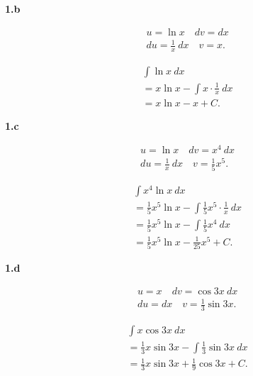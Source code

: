 \documentclass{report}
\begin{document}
    \bigbreak \noindent 
    \textbf{1.b}
    \bigbreak \noindent 
    \begin{minipage}[t]{0.47\textwidth}
        \begin{align*}
            &u = \ln{x} \quad dv = dx \\
            &du = \frac{1}{x}\ dx \quad v = x
        .\end{align*}
    \end{minipage}
    \begin{minipage}[t]{0.47\textwidth}
        \begin{align*}
            &\int \ln{x}\ dx \\
           &=x\ln{x} - \int x \cdot \frac{1}{x}\ dx \\
           &= x\ln{x} - x + C
        .\end{align*}
    \end{minipage}

    \bigbreak \noindent 
    \textbf{1.c}
    \bigbreak \noindent 
    \begin{minipage}[t]{0.47\textwidth}
        \begin{align*}
            &u = \ln{x} \quad dv = x^{4}\ dx \\
            &du = \frac{1}{x}\ dx \quad v = \frac{1}{5}x^{5}
        .\end{align*}
    \end{minipage}
    \begin{minipage}[t]{0.47\textwidth}
        \begin{align*}
           &\int x^{4}\ln{x}\ dx \\ 
           &=\frac{1}{5}x^{5}\ln{x} - \int \frac{1}{5}x^{5} \cdot \frac{1}{x}\ dx \\
           &=\frac{1}{5}x^{5}\ln{x} - \int \frac{1}{5}x^{4}\ dx \\
           &= \frac{1}{5}x^{5}\ln{x} - \frac{1}{25}x^{5} + C
        .\end{align*}
    \end{minipage}

    \pagebreak \bigbreak \noindent 
    \textbf{1.d}
    \bigbreak \noindent 
    \begin{minipage}[t]{0.47\textwidth}
        \begin{align*}
            &u = x \quad dv = \cos{3x}\ dx \\
            &du = dx \quad v = \frac{1}{3}\sin{3x}
        .\end{align*}
    \end{minipage}
    \begin{minipage}[t]{0.47\textwidth}
        \begin{align*}
            &\int x\cos{3x}\ dx \\
            &=\frac{1}{3}x\sin{3x} - \int \frac{1}{3}\sin{3x}\ dx \\
            &= \frac{1}{3}x\sin{3x} + \frac{1}{9}\cos{3x} + C
        .\end{align*}
    \end{minipage}
\end{document}
